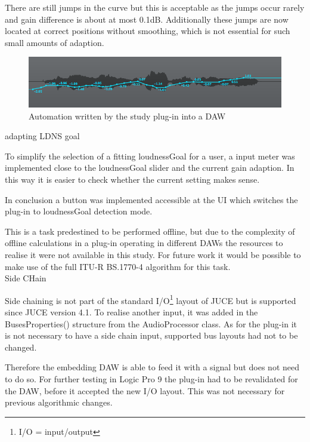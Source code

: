 There are still jumps in the curve but this is acceptable as the jumps occur rarely and gain difference is about at most 0.1dB. Additionally these jumps are now located at correct positions without smoothing, which is not essential for such small amounts of adaption.\\

\begin{figure}[H]
\includegraphics[width=\textwidth]{images/automation}
\caption{Automation written by the study plug-in into a DAW}
\label{auto}
\end{figure}

adapting LDNS goal

To simplify the selection of a fitting loudnessGoal for a user, a input meter was implemented close to the loudnessGoal slider and the current gain adaption. In this way it is easier to check whether the current setting makes sense. 

In conclusion a button was implemented accessible at the UI which switches the plug-in to loudnessGoal detection mode.


This is a task predestined to be performed offline, but due to the complexity of offline calculations in a plug-in operating in different DAWs the resources to realise it were not available in this study. For future work it would be possible to make use of the full ITU-R BS.1770-4 algorithm for this task.\\

Side CHain

Side chaining is not part of the standard I/O\footnote{I/O = input/output} layout of JUCE but is supported since JUCE version 4.1. To realise another input, it was added in the BusesProperties() structure from the AudioProcessor class. As for the plug-in it is not necessary to have a side chain input, supported bus layouts had not to be changed.

Therefore the embedding DAW is able to feed it with a signal but does not need to do so. For further testing in Logic Pro 9 the plug-in had to be revalidated for the DAW, before it accepted the new I/O layout. This was not necessary for previous algorithmic changes.\\

